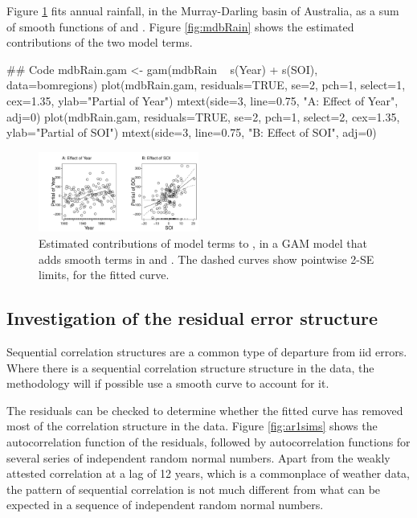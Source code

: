 Figure \ref{fig:mdbRainSM} fits annual rainfall, in the Murray-Darling basin of
Australia, as a sum of smooth functions of  and .
Figure \ref{fig:mdbRain} shows the estimated contributions of the two
model terms.
\begin{Schunk}
\begin{Sinput}
## Code
mdbRain.gam <- gam(mdbRain ~ s(Year) + s(SOI),
                   data=bomregions)
plot(mdbRain.gam, residuals=TRUE, se=2, pch=1,
     select=1, cex=1.35, ylab="Partial of Year")
mtext(side=3, line=0.75, "A: Effect of Year", adj=0)
plot(mdbRain.gam, residuals=TRUE, se=2, pch=1,
     select=2, cex=1.35, ylab="Partial of SOI")
mtext(side=3, line=0.75, "B: Effect of SOI", adj=0)
\end{Sinput}
\end{Schunk}
\begin{figure}
\begin{Schunk}


\centerline{\includegraphics[width=0.47\textwidth]{figs/12-mdb-gam-1} }

\end{Schunk}
  \caption{Estimated contributions of model terms to
    , in a GAM model that adds smooth terms in
     and . The dashed curves show pointwise
    2-SE limits, for the fitted curve.}\label{fig:mdbRainSM}
\end{figure}

\subsection*{Investigation of the residual error structure}
Sequential correlation structures are a common type of departure from
iid errors.  Where there is a sequential correlation structure
structure in the data, the methodology will if possible use a smooth
curve to account for it.

The residuals can be checked to determine whether the fitted curve
has removed most of the correlation structure in the data.
Figure \ref{fig:ar1sims} shows the autocorrelation function of the
residuals, followed by autocorrelation functions for several series of
independent random normal numbers.  Apart from the weakly attested
correlation at a lag of 12 years, which is a commonplace of weather
data, the pattern of sequential correlation is not much different from
what can be expected in a sequence of independent random normal
numbers.


